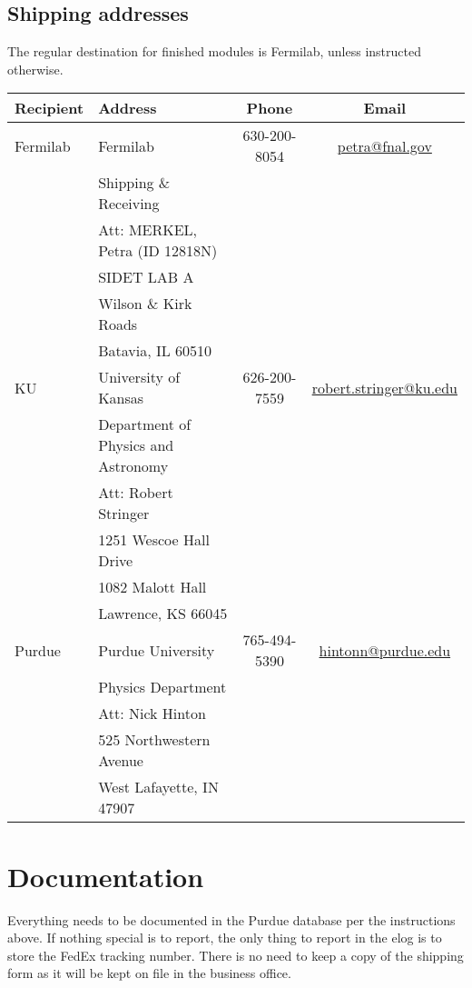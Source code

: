 \documentclass[12pt]{unlsilabsop}
\begin{document}
\subsection{Shipping addresses}
The regular destination for finished modules is Fermilab, unless instructed otherwise.

{\footnotesize
\begin{tabular}{llcc}
Recipient & Address & Phone & Email \\
              \hline
Fermilab & Fermilab & 630-200-8054 & \url{petra@fnal.gov} \\
    & Shipping \& Receiving \\
    & Att: MERKEL, Petra (ID 12818N) \\
    & SIDET LAB A \\
    & Wilson \& Kirk Roads \\
    & Batavia, IL 60510\\
              \hline
KU  & University of Kansas & 626-200-7559 & \url{robert.stringer@ku.edu} \\
    & Department of Physics and Astronomy\\
    & Att: Robert Stringer \\
    & 1251 Wescoe Hall Drive \\
    & 1082 Malott Hall \\
    & Lawrence, KS 66045 \\
              \hline
Purdue & Purdue University & 765-494-5390 & \url{hintonn@purdue.edu} \\
    & Physics Department \\
    & Att: Nick Hinton \\
    & 525 Northwestern Avenue \\
    & West Lafayette, IN 47907 \\
              \hline
\end{tabular}
}

\section{Documentation}
Everything needs to be documented in the Purdue database per the instructions above. If nothing special is to report, the only thing to report in the elog is to store the FedEx tracking number. There is no need to keep a copy of the shipping form as it will be kept on file in the business office.
\end{document}
